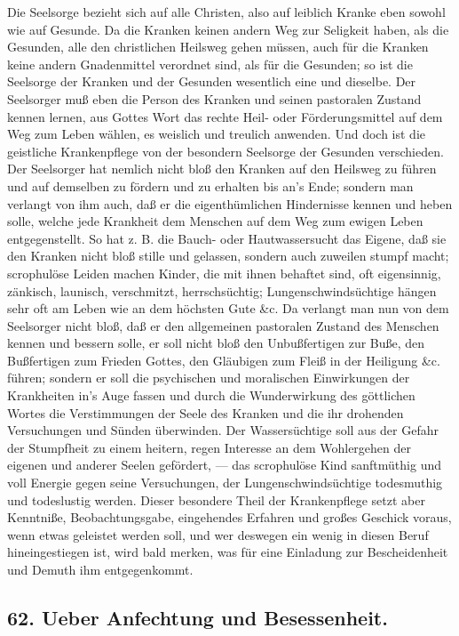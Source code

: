 Die Seelsorge bezieht sich auf alle Christen, also auf leiblich Kranke eben sowohl wie auf Gesunde. Da die Kranken keinen andern Weg zur Seligkeit haben, als die Gesunden, alle den christlichen Heilsweg gehen müssen, auch für die Kranken keine andern Gnadenmittel verordnet sind, als für die Gesunden; so ist die Seelsorge der Kranken und der Gesunden wesentlich eine und dieselbe. Der Seelsorger muß eben die Person des Kranken und seinen pastoralen Zustand kennen lernen, aus Gottes Wort das rechte Heil- oder Förderungsmittel auf dem Weg zum Leben wählen, es weislich und treulich anwenden. Und doch ist die geistliche Krankenpflege von der besondern Seelsorge der Gesunden verschieden. Der Seelsorger hat nemlich nicht bloß den Kranken auf den Heilsweg zu führen und auf demselben zu fördern und zu erhalten bis an’s Ende; sondern man verlangt von ihm auch, daß er die eigenthümlichen Hindernisse kennen und heben solle, welche jede Krankheit dem Menschen auf dem Weg zum ewigen Leben entgegenstellt. So hat z. B. die Bauch- oder Hautwassersucht das Eigene, daß sie den Kranken nicht bloß stille und gelassen, sondern auch zuweilen stumpf macht; scrophulöse Leiden machen Kinder, die mit ihnen behaftet sind, oft eigensinnig, zänkisch, launisch, verschmitzt, herrschsüchtig; Lungenschwindsüchtige hängen sehr oft am
Leben wie an dem höchsten Gute \&c. Da verlangt man nun von dem Seelsorger nicht bloß, daß er den allgemeinen pastoralen Zustand des Menschen kennen und bessern solle, er soll nicht bloß den Unbußfertigen zur Buße, den Bußfertigen zum Frieden Gottes, den Gläubigen zum Fleiß in der Heiligung \&c. führen; sondern er soll die psychischen und moralischen Einwirkungen der Krankheiten in’s Auge fassen und durch die Wunderwirkung des göttlichen Wortes die Verstimmungen der Seele des Kranken und die ihr drohenden Versuchungen und Sünden überwinden. Der Wassersüchtige soll aus der Gefahr der Stumpfheit zu einem heitern, regen Interesse an dem Wohlergehen der eigenen und anderer Seelen gefördert, — das scrophulöse Kind sanftmüthig und voll Energie gegen seine Versuchungen, der Lungenschwindsüchtige todesmuthig und todeslustig werden. Dieser besondere Theil der Krankenpflege setzt aber Kenntniße, Beobachtungsgabe, eingehendes Erfahren und großes Geschick voraus, wenn etwas geleistet werden soll, und wer deswegen ein wenig in diesen Beruf hineingestiegen ist, wird bald merken, was für eine Einladung zur Bescheidenheit und Demuth ihm entgegenkommt.

\subsection*{62. Ueber Anfechtung und Besessenheit.}

